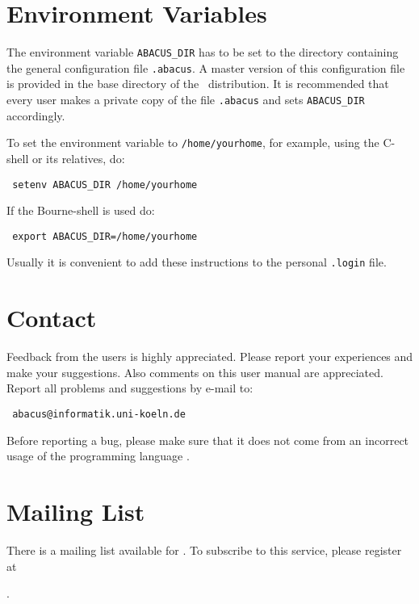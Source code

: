 \section{Environment Variables}
\label{section:env-variables}
The environment variable 
{\tt ABACUS\_DIR} has to be set to the directory
containing the general configuration file {\tt .abacus}. A master version
of this configuration file is provided in the base directory of the \ABACUS\ distribution.
It is recommended that every user makes a private copy of the file {\tt .abacus} and sets
{\tt ABACUS\_DIR} accordingly.

To set the environment variable to {\tt /home/yourhome}, for example, using the C-shell 
or its relatives, do:
\begin{flushleft}
\tt
setenv ABACUS\_DIR /home/yourhome\\
\end{flushleft}

\noindent
If the Bourne-shell is used do:
\begin{flushleft}
\tt
export ABACUS\_DIR=/home/yourhome\\
\end{flushleft}
Usually it is convenient to add these instructions to the personal {\tt .login}
file.

\section{Contact}

Feedback from the users is highly appreciated. Please report your
experiences and make your suggestions. Also comments on this user
manual are appreciated. 
Report all problems and suggestions by e-mail to:
\begin{center}
\tt
abacus@informatik.uni-koeln.de
\end{center}
Before reporting a bug, please make sure that it does not come from an
incorrect usage of the programming language \CPLUSPLUS.


\section{Mailing List}
There is a mailing list available for \ABACUS. 
To subscribe to this service, please register at
\begin{center} 
.
\end{center}
